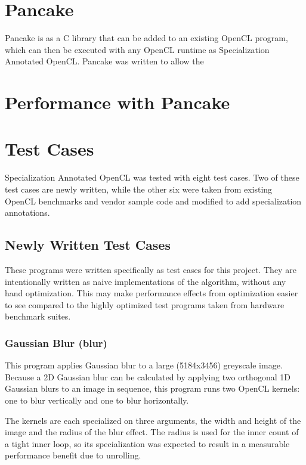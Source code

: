 \documentclass{acm_proc_article-sp}
\begin{document}
\section{Pancake}

Pancake is as a C library that can be added to an existing OpenCL program,
which can then be executed with any OpenCL runtime as Specialization Annotated
OpenCL. Pancake was written to allow the 

\section{Performance with Pancake}




\section{Test Cases}
\label{test-cases}

Specialization Annotated OpenCL was tested with eight test cases. Two of these
test cases are newly written, while the other six were taken from existing
OpenCL benchmarks and vendor sample code and modified to add specialization
annotations.

\subsection{Newly Written Test Cases}

These programs were written specifically as test cases for this project. They
are intentionally written as naive implementations of the algorithm, without
any hand optimization. This may make performance effects from optimization
easier to see compared to the highly optimized test programs taken from
hardware benchmark suites.

\subsubsection{Gaussian Blur (blur)}

This program applies Gaussian blur to a large (5184x3456) greyscale image.
Because a 2D Gaussian blur can be calculated by applying two orthogonal 1D
Gaussian blurs to an image in sequence, this program runs two OpenCL kernels:
one to blur vertically and one to blur horizontally.

The kernels are each specialized on three arguments, the width and height of
the image and the radius of the blur effect. The radius is used for the inner
count of a tight inner loop, so its specialization was expected to result in a
measurable performance benefit due to unrolling.
\end{document}

